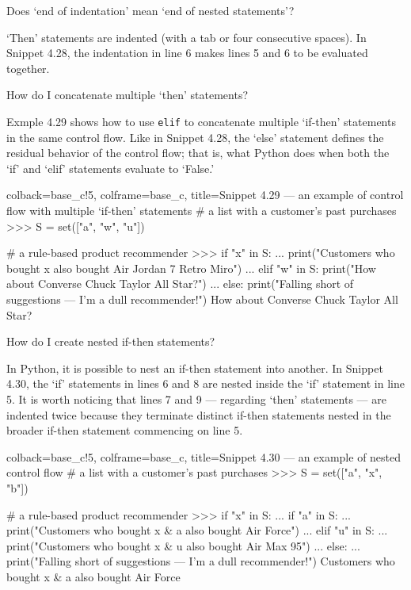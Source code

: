 \documentclass[a4paper,11pt]{book}
\newcommand{\question}[1]{%
    \begin{tcolorbox}[colback=comp_c!10,colframe=comp_c,sidebyside align=top,width=\linewidth,before skip=1ex]
        #1
    \end{tcolorbox}
    \switchcolumn%
}
\newcommand{\note}[1]{%
    \begin{tcolorbox}[colback=white!0,colframe=white!10,width=\linewidth,before skip=1ex]
        #1
    \end{tcolorbox}
}
\begin{document}
\begin{paracol}{2}
	\question{\raggedright Does `end of indentation' mean `end of nested statements'?}
	\note{`Then' statements are indented (with a tab or four consecutive spaces). In Snippet 4.28, the indentation in line 6 makes lines 5 and 6 to be evaluated together.}
\end{paracol}

\begin{paracol}{2}
\question{\raggedright How do I concatenate multiple `then' statements?}
\note{Exmple 4.29 shows how to use \texttt{elif} to concatenate multiple `if-then' statements in the same control flow. Like in Snippet 4.28, the `else' statement defines the residual behavior of the control flow; that is, what Python does when both the `if' and `elif' statements evaluate to `False.'}
\end{paracol}

\begin{pythoncode}[linenos=true,]{colback=base_c!5, colframe=base_c, title=\sffamily Snippet 4.29 --- an example of control flow with multiple `if-then' statements}
# a list with a customer's past purchases
>>> S = set(["a", "w", "u"])

# a rule-based product recommender 
>>> if "x" in S:
...     print("Customers who bought x also bought Air Jordan 7 Retro Miro")
... elif "w" in S:
	print("How about Converse Chuck Taylor All Star?")
... else:
	print("Falling short of suggestions --- I'm a dull recommender!")
How about Converse Chuck Taylor All Star?
\end{pythoncode}

\begin{paracol}{2}
\question{\raggedright How do I create nested if-then statements?}
\note{In Python, it is possible to nest an if-then statement into another. In Snippet 4.30, the `if' statements in lines 6 and 8 are nested inside the `if' statement in line 5. It is worth noticing that lines 7 and 9 --- regarding `then' statements --- are indented twice because they terminate distinct if-then statements nested in the broader if-then statement commencing on line 5.}
\end{paracol}

\begin{pythoncode}[linenos=true,]{colback=base_c!5, colframe=base_c, title=\sffamily Snippet 4.30 --- an example of nested control flow}
# a list with a customer's past purchases
>>> S = set(["a", "x", "b"])

# a rule-based product recommender 
>>> if "x" in S:
...     if "a" in S:
...         print("Customers who bought x & a also bought Air Force")
...     elif "u" in S:
...         print("Customers who bought x & u also bought Air Max 95")
... else:
...    print("Falling short of suggestions --- I'm a dull recommender!") 
Customers who bought x & a also bought Air Force
\end{pythoncode}
\end{document}
